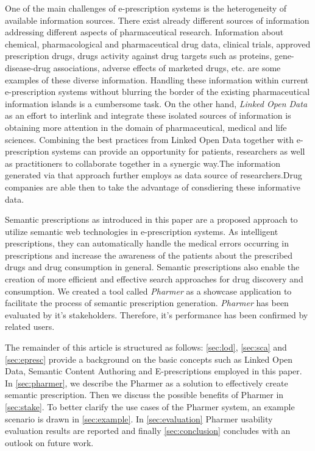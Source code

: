 \documentclass[10pt, conference, compsocconf]{IEEEtran}
\begin{document}
One of the main challenges of e-prescription systems is the heterogeneity of available information sources.
There exist already different sources of information addressing different aspects of pharmaceutical research.
Information about chemical, pharmacological and pharmaceutical drug data, clinical trials, approved prescription drugs, drugs activity against drug targets such as proteins, gene-disease-drug associations, adverse effects of marketed drugs, etc. are some examples of these diverse information.
Handling these information within current e-prescription systems without blurring the border of the existing pharmaceutical information islands is a cumbersome task.
On the other hand, \emph{Linked Open Data} as an effort to interlink and integrate these isolated sources of information is obtaining more attention in the domain of pharmaceutical, medical and life sciences.
Combining the best practices from Linked Open Data together with e-prescription systems can provide an opportunity for patients, researchers as well as practitioners to collaborate together in a synergic way.The information generated via that approach further employs as data source of researchers.Drug companies are able then to take the advantage of consdiering these informative data.

Semantic prescriptions as introduced in this paper are a proposed approach to utilize semantic web technologies in e-prescription systems.
As intelligent prescriptions, they can automatically handle the medical errors occurring in prescriptions and increase the awareness of the patients about the prescribed drugs and drug consumption in general.
Semantic prescriptions also enable the creation of more efficient and effective search approaches for drug discovery and consumption.
We created a tool called \emph{Pharmer} as a showcase application to facilitate the process of semantic prescription generation.
\emph{Pharmer} has been evaluated by it's stakeholders. Therefore, it's performance has been confirmed by related users.

The remainder of this article is structured as follows:
\autoref{sec:lod}, \autoref{sec:sca} and \autoref{sec:epresc} provide a background on the basic concepts such as Linked Open Data, Semantic Content Authoring and E-prescriptions employed in this paper.
In \autoref{sec:pharmer}, we describe the Pharmer as a solution to effectively create semantic prescription.
Then we discuss the possible benefits of Pharmer in \autoref{sec:stake}.
To better clarify the use cases of the Pharmer system, an example scenario is drawn in \autoref{sec:example}.
In \autoref{sec:evaluation} Pharmer usability evaluation results are reported and finally \ref{sec:conclusion} concludes with an outlook on future work.
\end{document}
